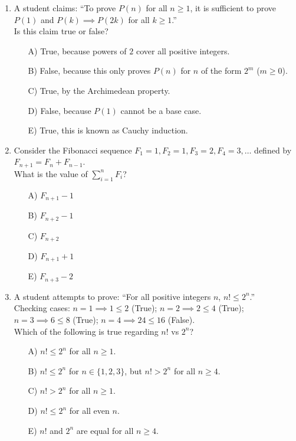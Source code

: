 \documentclass[11pt,a4paper]{article}
\begin{document}
\begin{enumerate}
\item A student claims: ``To prove $P(n)$ for all $n \ge 1$, it is sufficient to prove $P(1)$ and $P(k) \implies P(2k)$ for all $k \ge 1$.''\\
Is this claim true or false?
\begin{itemize}
\item[A)] True, because powers of $2$ cover all positive integers.
\item[B)] False, because this only proves $P(n)$ for $n$ of the form $2^m$ ($m \ge 0$).
\item[C)] True, by the Archimedean property.
\item[D)] False, because $P(1)$ cannot be a base case.
\item[E)] True, this is known as Cauchy induction.
\end{itemize}

\item Consider the Fibonacci sequence $F_1 = 1, F_2 = 1, F_3 = 2, F_4 = 3, \dots$ defined by $F_{n+1} = F_n + F_{n-1}$.\\
What is the value of $\sum_{i=1}^n F_i$?
\begin{itemize}
\item[A)] $F_{n+1} - 1$
\item[B)] $F_{n+2} - 1$
\item[C)] $F_{n+2}$
\item[D)] $F_{n+1} + 1$
\item[E)] $F_{n+3} - 2$
\end{itemize}

\item A student attempts to prove: ``For all positive integers $n$, $n! \le 2^n$.''\\
Checking cases: $n=1 \implies 1 \le 2$ (True); $n=2 \implies 2 \le 4$ (True); $n=3 \implies 6 \le 8$ (True); $n=4 \implies 24 \le 16$ (False).\\
Which of the following is true regarding $n!$ vs $2^n$?
\begin{itemize}
\item[A)] $n! \le 2^n$ for all $n \ge 1$.
\item[B)] $n! \le 2^n$ for $n \in \{1, 2, 3\}$, but $n! > 2^n$ for all $n \ge 4$.
\item[C)] $n! > 2^n$ for all $n \ge 1$.
\item[D)] $n! \le 2^n$ for all even $n$.
\item[E)] $n!$ and $2^n$ are equal for all $n \ge 4$.
\end{itemize}


\end{enumerate}
\end{document}
